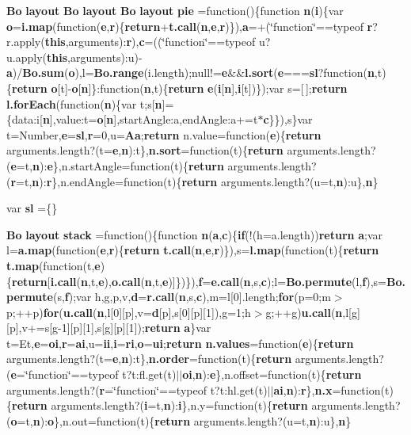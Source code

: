 \begin{DoxyCompactItemize}
\item 
{\bf Bo} {\bf layout} {\bf Bo} {\bf layout} {\bf Bo} {\bf layout} {\bf pie} =function()\{function {\bf n}({\bf i})\{var {\bf o}={\bf i.\+map}(function({\bf e},{\bf r})\{{\bf return}+{\bf t.\+call}({\bf n},{\bf e},{\bf r})\}),{\bf a}=+(\char`\"{}function\char`\"{}==typeof {\bf r}?r.\+apply({\bf this},arguments)\+:{\bf r}),{\bf c}=((\char`\"{}function\char`\"{}==typeof u?u.\+apply({\bf this},arguments)\+:u)-\/{\bf a})/{\bf Bo.\+sum}({\bf o}),l={\bf Bo.\+range}(i.\+length);null!={\bf e}\&\&{\bf l.\+sort}({\bf e}==={\bf sl}?function({\bf n},t)\{{\bf return} {\bf o}[t]-\/{\bf o}[{\bf n}]\}\+:function({\bf n},t)\{{\bf return} {\bf e}({\bf i}[{\bf n}],{\bf i}[t])\});var s=[$\,$];{\bf return} {\bf l.\+for\+Each}(function({\bf n})\{var t;s[{\bf n}]=\{data\+:i[{\bf n}],value\+:t={\bf o}[{\bf n}],start\+Angle\+:a,end\+Angle\+:a+=t$\ast${\bf c}\}\}),s\}var t=Number,{\bf e}={\bf sl},{\bf r}=0,u={\bf Aa};{\bf return} n.\+value=function({\bf e})\{{\bf return} arguments.\+length?(t={\bf e},{\bf n})\+:t\},{\bf n.\+sort}=function(t)\{{\bf return} arguments.\+length?({\bf e}=t,{\bf n})\+:{\bf e}\},n.\+start\+Angle=function(t)\{{\bf return} arguments.\+length?({\bf r}=t,{\bf n})\+:{\bf r}\},n.\+end\+Angle=function(t)\{{\bf return} arguments.\+length?(u=t,{\bf n})\+:u\},{\bf n}\}
\item 
var {\bf sl} =\{\}
\item 
{\bf Bo} {\bf layout} {\bf stack} =function()\{function {\bf n}({\bf a},{\bf c})\{{\bf if}(!(h=a.\+length)){\bf return} {\bf a};var l={\bf a.\+map}(function({\bf e},{\bf r})\{{\bf return} {\bf t.\+call}({\bf n},{\bf e},{\bf r})\}),s={\bf l.\+map}(function(t)\{{\bf return} {\bf t.\+map}(function(t,{\bf e})\{{\bf return}[{\bf i.\+call}({\bf n},t,{\bf e}),{\bf o.\+call}({\bf n},t,{\bf e})]\})\}),{\bf f}={\bf e.\+call}({\bf n},s,{\bf c});l={\bf Bo.\+permute}(l,{\bf f}),s={\bf Bo.\+permute}(s,{\bf f});var h,g,p,v,{\bf d}={\bf r.\+call}({\bf n},s,{\bf c}),m=l[0].length;{\bf for}(p=0;m$>$p;++p){\bf for}({\bf u.\+call}({\bf n},l[0][p],v={\bf d}[p],s[0][p][1]),g=1;h$>$g;++g){\bf u.\+call}({\bf n},l[g][p],v+=s[g-\/1][p][1],s[g][p][1]);{\bf return} {\bf a}\}var t=Et,{\bf e}={\bf oi},{\bf r}={\bf ai},u={\bf ii},{\bf i}={\bf ri},{\bf o}={\bf ui};{\bf return} {\bf n.\+values}=function({\bf e})\{{\bf return} arguments.\+length?(t={\bf e},{\bf n})\+:t\},{\bf n.\+order}=function(t)\{{\bf return} arguments.\+length?({\bf e}=\char`\"{}function\char`\"{}==typeof t?t\+:fl.\+get(t)$\vert$$\vert${\bf oi},{\bf n})\+:{\bf e}\},n.\+offset=function(t)\{{\bf return} arguments.\+length?({\bf r}=\char`\"{}function\char`\"{}==typeof t?t\+:hl.\+get(t)$\vert$$\vert${\bf ai},{\bf n})\+:{\bf r}\},{\bf n.\+x}=function(t)\{{\bf return} arguments.\+length?({\bf i}=t,{\bf n})\+:{\bf i}\},n.\+y=function(t)\{{\bf return} arguments.\+length?({\bf o}=t,{\bf n})\+:{\bf o}\},n.\+out=function(t)\{{\bf return} arguments.\+length?(u=t,{\bf n})\+:u\},{\bf n}\}

\end{DoxyCompactItemize}
